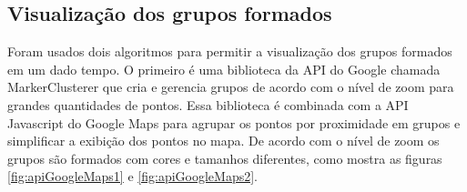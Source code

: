 \subsection{Visualização dos grupos formados}
Foram usados dois algoritmos para permitir a visualização dos grupos formados em um dado tempo.
O primeiro é uma biblioteca da API do Google chamada MarkerClusterer \cite{markerCluster} que cria e gerencia grupos de acordo com o nível de zoom para grandes quantidades de pontos.
Essa biblioteca é combinada com a API Javascript do Google Maps para agrupar os pontos por proximidade em grupos e simplificar a exibição dos pontos no mapa.
De acordo com o nível de zoom os grupos são formados com cores e tamanhos diferentes, como mostra as figuras \ref{fig:apiGoogleMaps1} e \ref{fig:apiGoogleMaps2}.
\begin{figure}[h]
	\centering	
\end{figure}
\FloatBarrier

\begin{figure}[h]
	\centering	
\end{figure}
\FloatBarrier

